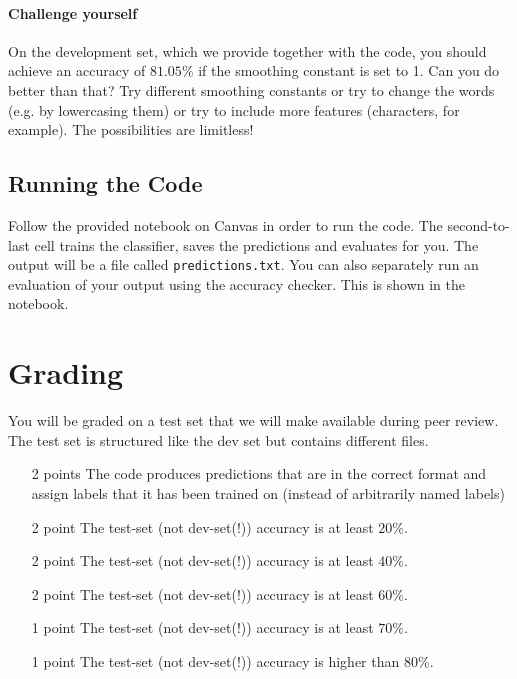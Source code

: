 \documentclass[11pt, a4paper]{article}
\begin{document}
\paragraph{Challenge yourself} On the development set, which we provide together with the code, you
should achieve an accuracy of $ 81.05\% $ if the smoothing constant is set to 1. Can you do better
than that? Try different smoothing constants or try to change the words (e.g. by lowercasing them) or
try to include more features (characters, for example). The possibilities are limitless! 

\subsection{Running the Code}
Follow the provided notebook on Canvas in order to run the code.
The second-to-last cell trains the classifier, saves the predictions and evaluates for you.
The output will be a file called \texttt{predictions.txt}. You can also separately run an evaluation of your output using the
accuracy checker. This is shown in the notebook.

\section{Grading}
You will be graded on a test set that we will make available during peer review. The test set
is structured like the dev set but contains different files.
\begin{itemize}
\item[2 points] The code produces predictions that are in the correct format and assign labels that
it has been trained on (instead of arbitrarily named labels)
\item[2 point] The test-set (not dev-set(!)) accuracy is at least $ 20\% $.
\item[2 point] The test-set (not dev-set(!)) accuracy is at least $ 40\% $.
\item[2 point] The test-set (not dev-set(!)) accuracy is at least $ 60\% $.
\item[1 point] The test-set (not dev-set(!)) accuracy is at least $ 70\% $.
\item[1 point] The test-set (not dev-set(!)) accuracy is higher than $ 80\% $.
\end{itemize}
\end{document}
